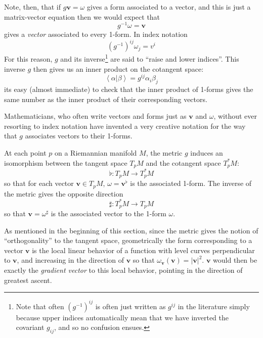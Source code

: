 \documentclass[../master.tex]{subfiles}
\begin{document}
	Note, then, that if $g \mathbf v = \omega$ gives a form associated to a vector, and this is just a matrix-vector equation then we would expect that 
	\begin{equation}
		g^{-1} \omega = \mathbf v
	\end{equation}
	gives a \emph{vector} associated to every 1-form. In index notation
	\begin{equation}
		(g^{-1})^{ij} \omega_j = v^i
	\end{equation}
	For this reason, $g$ and its inverse\footnote{Note that often $(g^{-1})^{ij}$ is often just written as $g^{ij}$ in the literature simply because upper indices automatically mean that we have inverted the covariant $g_{ij}$, and so no confusion ensues.} are said to ``raise and lower indices''. This inverse $g$ then gives us an inner product on the cotangent space:
	\begin{equation}
		\left< \alpha | \beta \right> = g^{ij} \alpha_i \beta_j
	\end{equation} 
	its easy (almost immediate) to check that the inner product of 1-forms gives the same number as the inner product of their corresponding vectors.
	
	Mathematicians, who often write vectors and forms just as $\mathbf v$ and $\omega$, without ever resorting to index notation have invented a very creative notation for the way that $g$ associates vectors to their 1-forms.
	\begin{prop}
		At each point $p$ on a Riemannian manifold $M$, the metric $g$ induces an isomorphism between the tangent space $T_pM$ and the cotangent space $T^*_pM$:
		\begin{equation}
			\flat: T_pM \rightarrow T^*_pM
		\end{equation}
		so that for each vector $\mathbf v \in T_pM$, $\omega = \mathbf v^\flat$ is the associated 1-form. The inverse of the metric gives the opposite direction
		\begin{equation}
			\sharp: T^*_pM \rightarrow T_pM
		\end{equation}
		so that $\mathbf v = \omega^\sharp$ is the associated vector to the 1-form $\omega$.
	\end{prop}

	As mentioned in the beginning of this section, since the metric gives the notion of ``orthogonality'' to the tangent space, geometrically the form corresponding to a vector $\mathbf v$ is the local linear behavior of a function with level curves perpendicular to $\mathbf v$, and increasing in the direction of $\mathbf v$ so that $\omega_{\mathbf v}(\mathbf v) = |\mathbf v|^2$. $\mathbf v$ would then be exactly the \emph{gradient vector} to this local behavior, pointing in the direction of greatest ascent. 
	
\end{document}
